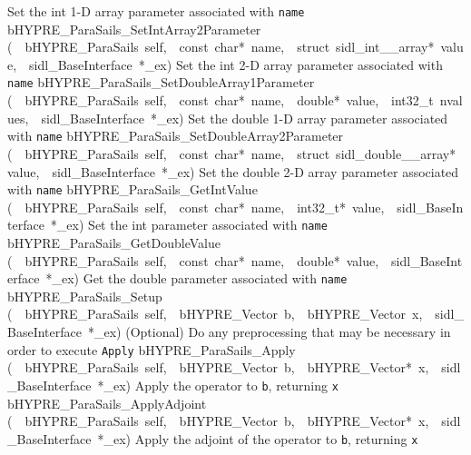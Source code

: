 \documentclass{article}
\begin{document}
\begin{cxxentry}
\begin{cxxentry}
\begin{cxxnames}
        {
Set the int 1-D array parameter associated with {\tt name}}
        {}
\label{cxx.6.5.20}
        {bHYPRE\_ParaSails\_SetIntArray2Parameter}
        {(\ \ bHYPRE\_ParaSails\ self,\ \ const\ char*\ name,\ \ struct\ sidl\_int\_\_array*\ value,\ \ sidl\_BaseInterface\ *\_ex)}
        {
Set the int 2-D array parameter associated with {\tt name}}
        {}
\label{cxx.6.5.21}
        {bHYPRE\_ParaSails\_SetDoubleArray1Parameter}
        {(\ \ bHYPRE\_ParaSails\ self,\ \ const\ char*\ name,\ \ double*\ value,\ \ int32\_t\ nvalues,\ \ sidl\_BaseInterface\ *\_ex)}
        {
Set the double 1-D array parameter associated with {\tt name}}
        {}
\label{cxx.6.5.22}
        {bHYPRE\_ParaSails\_SetDoubleArray2Parameter}
        {(\ \ bHYPRE\_ParaSails\ self,\ \ const\ char*\ name,\ \ struct\ sidl\_double\_\_array*\ value,\ \ sidl\_BaseInterface\ *\_ex)}
        {
Set the double 2-D array parameter associated with {\tt name}}
        {}
\label{cxx.6.5.23}
        {bHYPRE\_ParaSails\_GetIntValue}
        {(\ \ bHYPRE\_ParaSails\ self,\ \ const\ char*\ name,\ \ int32\_t*\ value,\ \ sidl\_BaseInterface\ *\_ex)}
        {
Set the int parameter associated with {\tt name}}
        {}
\label{cxx.6.5.24}
        {bHYPRE\_ParaSails\_GetDoubleValue}
        {(\ \ bHYPRE\_ParaSails\ self,\ \ const\ char*\ name,\ \ double*\ value,\ \ sidl\_BaseInterface\ *\_ex)}
        {
Get the double parameter associated with {\tt name}}
        {}
\label{cxx.6.5.25}
        {bHYPRE\_ParaSails\_Setup}
        {(\ \ bHYPRE\_ParaSails\ self,\ \ bHYPRE\_Vector\ b,\ \ bHYPRE\_Vector\ x,\ \ sidl\_BaseInterface\ *\_ex)}
        {
(Optional) Do any preprocessing that may be necessary in
order to execute {\tt Apply}}
        {}
\label{cxx.6.5.26}
        {bHYPRE\_ParaSails\_Apply}
        {(\ \ bHYPRE\_ParaSails\ self,\ \ bHYPRE\_Vector\ b,\ \ bHYPRE\_Vector*\ x,\ \ sidl\_BaseInterface\ *\_ex)}
        {
Apply the operator to {\tt b}, returning {\tt x}}
        {}
\label{cxx.6.5.27}
        {bHYPRE\_ParaSails\_ApplyAdjoint}
        {(\ \ bHYPRE\_ParaSails\ self,\ \ bHYPRE\_Vector\ b,\ \ bHYPRE\_Vector*\ x,\ \ sidl\_BaseInterface\ *\_ex)}
        {
Apply the adjoint of the operator to {\tt b}, returning {\tt x}}
        {}
\label{cxx.6.5.28}

\end{cxxnames}
\end{cxxentry}
\end{cxxentry}
\end{document}
